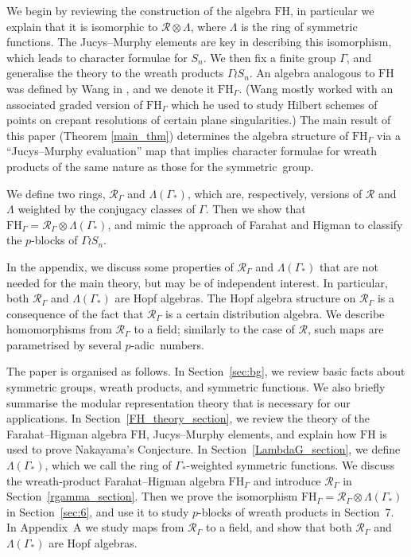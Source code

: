 \documentclass[10pt]{article}
\theoremstyle{definition}
\newcommand{\RGamma}{\mathcal{R}_{\Gamma}}
\newcommand{\LambdaG}{\Lambda(\Gamma_*)}
\newcommand{\FH}{\mathrm{FH}}
\newcommand{\FHG}{\mathrm{FH}_{\Gamma}}
\begin{document}
We begin by reviewing the construction of the algebra $\FH$, in particular we explain that it is isomorphic to $\mathcal{R} \otimes \Lambda$, where $\Lambda$ is the ring of symmetric functions. The Jucys--Murphy elements are key in describing this isomorphism, which leads to character formulae for $S_n$. We then fix a finite group $\Gamma$, and generalise the theory to the wreath products $\Gamma \wr S_n$. An algebra analogous to $\FH$ was defined by Wang in \cite{Wang1}, and we denote it $\FHG$. (Wang mostly worked with an associated graded version of $\FHG$ which he used to study Hilbert schemes of points on crepant resolutions of certain plane singularities.) The main result of this paper (Theorem \ref{main_thm}) determines the algebra structure of $\FHG$ via a ``Jucys--Murphy evaluation'' map that implies character formulae for wreath products of the same nature as those for the symmetric~group.

We define two rings, $\RGamma$ and $\LambdaG$, which are, respectively, versions of $\mathcal{R}$ and $\Lambda$ weighted by the conjugacy classes of $\Gamma$. Then we show that $\FHG = \RGamma \otimes \LambdaG$, and mimic the approach of Farahat and Higman to classify the $p$-blocks of $\Gamma \wr S_n$.  

In the appendix, we discuss some properties of $\RGamma$ and $\LambdaG$ that are not needed for the main theory, but may be of independent interest. In particular, both $\RGamma$ and $\LambdaG$ are Hopf algebras. The Hopf algebra structure on $\RGamma$ is a consequence of the fact that $\RGamma$ is a certain distribution algebra. We describe homomorphisms from $\RGamma$ to a field; similarly to the case of $\mathcal{R}$, such maps are parametrised by several $p$-adic~numbers.

The paper is organised as follows. In Section~\ref{sec:bg}, we review basic facts about symmetric groups, wreath products, and symmetric functions. 
We also briefly summarise the modular representation theory that is necessary for our applications.
In Section~\ref{FH_theory_section}, we review the theory of the Farahat--Higman algebra $\FH$, Jucys--Murphy elements, and explain how $\FH$ is used to prove Nakayama's Conjecture.
In Section~\ref{LambdaG_section}, we define $\LambdaG$, which we call the ring of $\Gamma_*$-weighted symmetric functions.
We discuss the wreath-product Farahat--Higman algebra $\FHG$ and introduce $\RGamma$ in Section~\ref{rgamma_section}.
Then we prove the isomorphism $\FHG = \RGamma \otimes \LambdaG$ in Section~\ref{sec:6}, and use it to study $p$-blocks of wreath products in Section~\textup{7}. 
In  Appendix~\textup{A} we study maps from $\RGamma$ to a field, and show that both $\RGamma$ and $\LambdaG$ are Hopf algebras.
\end{document}
